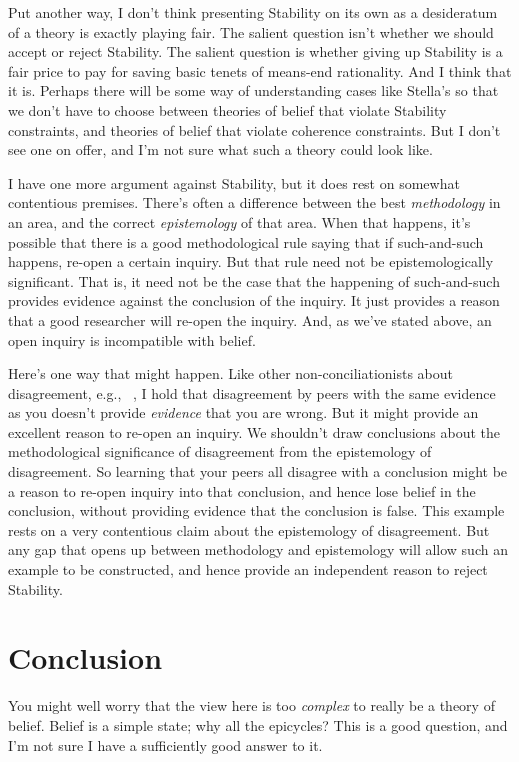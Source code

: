 Put another way, I don't think presenting Stability on its own as a desideratum of a theory is exactly playing fair. The salient question isn't whether we should accept or reject Stability. The salient question is whether giving up Stability is a fair price to pay for saving basic tenets of means-end rationality. And I think that it is. Perhaps there will be some way of understanding cases like Stella's so that we don't have to choose between theories of belief that violate Stability constraints, and theories of belief that violate coherence constraints. But I don't see one on offer, and I'm not sure what such a theory could look like.

I have one more argument against Stability, but it does rest on somewhat contentious premises. There's often a difference between the best \emph{methodology} in an area, and the correct \emph{epistemology} of that area. When that happens, it's possible that there is a good methodological rule saying that if such-and-such happens, re-open a certain inquiry. But that rule need not be epistemologically significant. That is, it need not be the case that the happening of such-and-such provides evidence against the conclusion of the inquiry. It just provides a reason that a good researcher will re-open the inquiry. And, as we've stated above, an open inquiry is incompatible with belief.

Here's one way that might happen. Like other non-conciliationists about disagreement, e.g., ~\citet{Kelly2010-KELPDA}, I hold that disagreement by peers with the same evidence as you doesn't provide \emph{evidence} that you are wrong. But it might provide an excellent reason to re-open an inquiry. We shouldn't draw conclusions about the methodological significance of disagreement from the epistemology of disagreement. So learning that your peers all disagree with a conclusion might be a reason to re-open inquiry into that conclusion, and hence lose belief in the conclusion, without providing evidence that the conclusion is false. This example rests on a very contentious claim about the epistemology of disagreement. But any gap that opens up between methodology and epistemology will allow such an example to be constructed, and hence provide an independent reason to reject Stability.

\section{Conclusion}

You might well worry that the view here is too \emph{complex} to really be a theory of belief. Belief is a simple state; why all the epicycles? This is a good question, and I'm not sure I have a sufficiently good answer to it.

